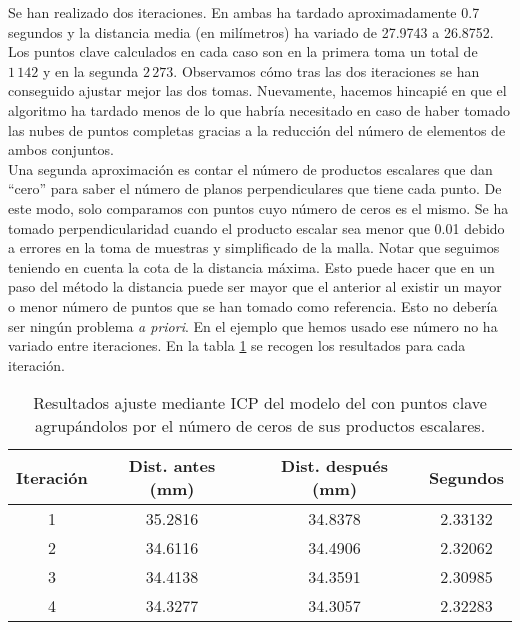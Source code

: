 Se han realizado dos iteraciones. En ambas ha tardado aproximadamente 0.7 segundos y la distancia media (en milímetros) ha variado de 27.9743 a 26.8752. Los puntos clave calculados en cada caso son en la primera toma un total de $ 1\,142 $ y en la segunda $ 2\,273 $. Observamos cómo tras las dos iteraciones se han conseguido ajustar mejor las dos tomas. Nuevamente, hacemos hincapié en que el algoritmo ha tardado menos de lo que habría necesitado en caso de haber tomado las nubes de puntos completas gracias a la reducción del número de elementos de ambos conjuntos. \\

Una segunda aproximación es contar el número de productos escalares que dan ``cero'' para saber el número de planos perpendiculares que tiene cada punto. De este modo, solo comparamos con puntos cuyo número de ceros es el mismo. Se ha tomado perpendicularidad cuando el producto escalar sea menor que 0.01 debido a errores en la toma de muestras y simplificado de la malla. Notar que seguimos teniendo en cuenta la cota de la distancia máxima. Esto puede hacer que en un paso del método la distancia puede ser mayor que el anterior al existir un mayor o menor número de puntos que se han tomado como referencia. Esto no debería ser ningún problema \textit{a priori}. En el ejemplo que hemos usado ese número no ha variado entre iteraciones. En la tabla \ref{talbe:ICPceros} se recogen los resultados para cada iteración.\\

\begin{table}[h!]
	\centering
	\begin{tabular}{| c | c | c | c |} 
		\hline
		Iteración & Dist. antes (mm)  & Dist. después (mm) & Segundos \\
		\hline
		1 &  35.2816 &  34.8378 & 2.33132\\			 
		2 & 34.6116 &  34.4906 &   2.32062\\	
		3 &  34.4138 & 34.3591  & 2.30985\\
		4 & 34.3277 &  34.3057 & 2.32283\\
		\hline
	\end{tabular}
	\caption{Resultados ajuste mediante ICP del modelo del con puntos clave agrupándolos por el número de ceros de sus productos escalares.}
	\label{talbe:ICPceros}
\end{table}

